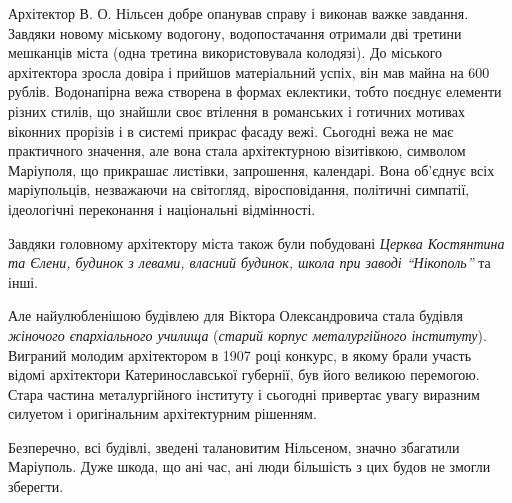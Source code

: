 Архітектор В. О. Нільсен добре опанував справу і виконав важке завдання.
Завдяки новому міському водогону, водопостачання отримали дві третини мешканців
міста (одна третина використовувала колодязі). До міського архітектора зросла
довіра і прийшов матеріальний успіх, він мав майна на 600 рублів. Водонапірна
вежа створена в формах еклектики, тобто поєднує елементи різних стилів, що
знайшли своє втілення в романських і готичних мотивах віконних прорізів і в
системі прикрас фасаду вежі. Сьогодні вежа не має практичного значення, але
вона стала архітектурною візитівкою, символом Маріуполя, що прикрашає
листівки, запрошення, календарі. Вона об'єднує всіх маріупольців, незважаючи на
світогляд, віросповідання, політичні симпатії, ідеологічні переконання і
національні відмінності.

Завдяки головному архітектору міста також були побудовані \emph{Церква Костянтина та
Єлени, будинок з левами, власний будинок, школа при заводі \enquote{Нікополь}} та інші.


Але найулюбленішою будівлею для Віктора Олександровича стала будівля \emph{жіночого
єпархіального училища} (\emph{старий корпус металургійного інституту}). Виграний
молодим архітектором в 1907 році конкурс, в якому брали участь відомі
архітектори Катеринославської губернії, був його великою перемогою. Стара
частина металургійного інституту і сьогодні привертає увагу виразним силуетом і
оригінальним архітектурним рішенням.

Безперечно, всі будівлі, зведені талановитим Нільсеном, значно збагатили
Маріуполь. Дуже шкода, що ані час, ані люди більшість з цих будов не змогли
зберегти.

